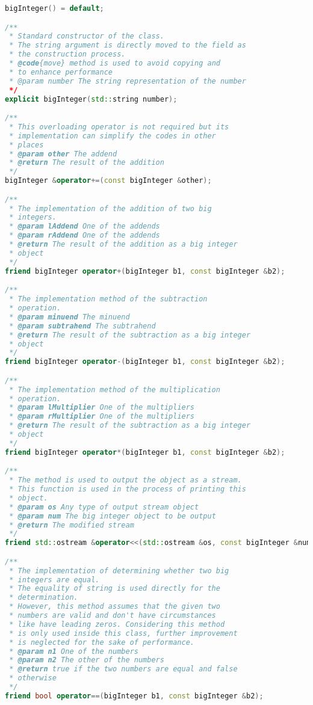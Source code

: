 \documentclass[a4paper]{report}
\begin{document}
\begin{lstlisting}[language=C++]
bigInteger() = default;

/**
 * Standard constructor of the class.
 * The string argument is directly moved to the field as 
 * the construction process.
 * @code{move} method is used to avoid copying and 
 * to enhance performance
 * @param number The string representation of the number
 */
explicit bigInteger(std::string number);

/**
 * This overloading operator is not required but its 
 * implementation can simplify the codes in other 
 * places
 * @param other The addend
 * @return The result of the addition
 */
bigInteger &operator+=(const bigInteger &other);

/**
 * The implementation of the addition of two big 
 * integers.
 * @param lAddend One of the addends
 * @param rAddend One of the addends
 * @return The result of the addition as a big integer
 * object
 */
friend bigInteger operator+(bigInteger b1, const bigInteger &b2);

/**
 * The implementation method of the subtraction 
 * operation.
 * @param minuend The minuend
 * @param subtrahend The subtrahend
 * @return The result of the subtraction as a big integer
 * object
 */
friend bigInteger operator-(bigInteger b1, const bigInteger &b2);

/**
 * The implementation method of the multiplication 
 * operation.
 * @param lMultiplier One of the multipliers
 * @param rMultiplier One of the multipliers
 * @return The result of the subtraction as a big integer
 * object
 */
friend bigInteger operator*(bigInteger b1, const bigInteger &b2);

/**
 * The method is used to output the object as a stream.
 * This function is used in the process of printing this
 * object.
 * @param os Any type of output stream object
 * @param num The big integer object to be output
 * @return The modified stream
 */
friend std::ostream &operator<<(std::ostream &os, const bigInteger &num);

/**
 * The implementation of determining whether two big
 * integers are equal.
 * The equality of string is used directly for the
 * determination.
 * However, this method assumes that the given two
 * numbers are valid and don't have circumstances
 * like have leading zeros. Considering this method
 * is only used inside this class, further improvement
 * is neglected for the sake of performance.
 * @param n1 One of the numbers
 * @param n2 The other of the numbers
 * @return true if the two numbers are equal and false
 * otherwise
 */
friend bool operator==(bigInteger b1, const bigInteger &b2);
\end{lstlisting}
\end{document}
